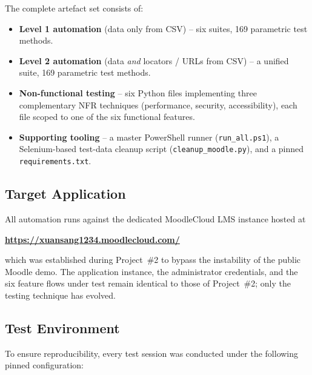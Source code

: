 \documentclass[twoside,final]{hcmut-report}
\begin{document}
The complete artefact set consists of:
\begin{itemize}
    \item \textbf{Level 1 automation} (data only from CSV) -- six suites, 169 parametric test methods.
    \item \textbf{Level 2 automation} (data \emph{and} locators / URLs from CSV) -- a unified suite, 169 parametric test methods.
    \item \textbf{Non-functional testing} -- six Python files implementing three complementary NFR techniques (performance, security, accessibility), each file scoped to one of the six functional features.
    \item \textbf{Supporting tooling} -- a master PowerShell runner (\texttt{run\_all.ps1}), a Selenium-based test-data cleanup script (\texttt{cleanup\_moodle.py}), and a pinned \texttt{requirements.txt}.
\end{itemize}

\subsection{Target Application}
All automation runs against the dedicated MoodleCloud LMS instance hosted at
\begin{center}
    \textbf{\url{https://xuansang1234.moodlecloud.com/}}
\end{center}
which was established during Project~\#2 to bypass the instability of the public Moodle demo. The application instance, the administrator credentials, and the six feature flows under test remain identical to those of Project~\#2; only the testing technique has evolved.

\subsection{Test Environment}
To ensure reproducibility, every test session was conducted under the following pinned configuration:
\end{document}

